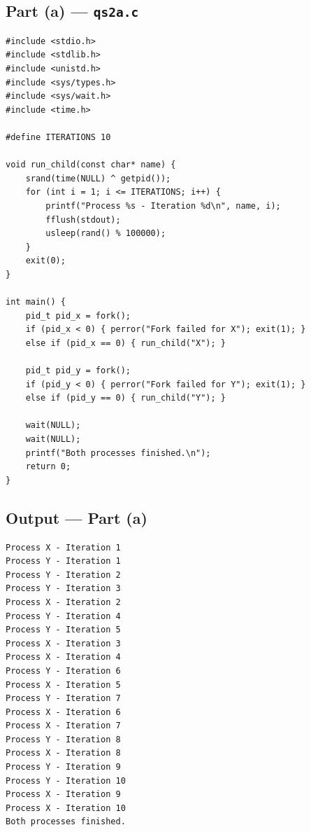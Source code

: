 \documentclass[11pt,a4paper]{article}
\begin{document}
\subsection*{Part (a) --- \texttt{qs2a.c}}
\begin{codebox}
\begin{lstlisting}[style=cstyle]
#include <stdio.h>
#include <stdlib.h>
#include <unistd.h>
#include <sys/types.h>
#include <sys/wait.h>
#include <time.h>

#define ITERATIONS 10

void run_child(const char* name) {
    srand(time(NULL) ^ getpid());
    for (int i = 1; i <= ITERATIONS; i++) {
        printf("Process %s - Iteration %d\n", name, i);
        fflush(stdout);
        usleep(rand() % 100000);
    }
    exit(0);
}

int main() {
    pid_t pid_x = fork();
    if (pid_x < 0) { perror("Fork failed for X"); exit(1); }
    else if (pid_x == 0) { run_child("X"); }

    pid_t pid_y = fork();
    if (pid_y < 0) { perror("Fork failed for Y"); exit(1); }
    else if (pid_y == 0) { run_child("Y"); }

    wait(NULL);
    wait(NULL);
    printf("Both processes finished.\n");
    return 0;
}
\end{lstlisting}
\end{codebox}

\subsection*{Output --- Part (a)}
\begin{outputbox}
\begin{lstlisting}[style=outputstyle]
Process X - Iteration 1
Process Y - Iteration 1
Process Y - Iteration 2
Process Y - Iteration 3
Process X - Iteration 2
Process Y - Iteration 4
Process Y - Iteration 5
Process X - Iteration 3
Process X - Iteration 4
Process Y - Iteration 6
Process X - Iteration 5
Process Y - Iteration 7
Process X - Iteration 6
Process X - Iteration 7
Process Y - Iteration 8
Process X - Iteration 8
Process Y - Iteration 9
Process Y - Iteration 10
Process X - Iteration 9
Process X - Iteration 10
Both processes finished.
\end{lstlisting}
\end{outputbox}
\end{document}
